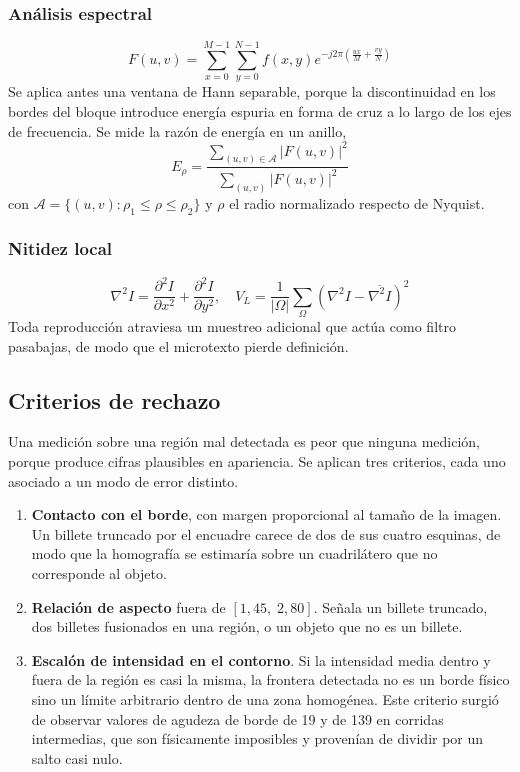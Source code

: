 \documentclass[conference]{IEEEtran}
\begin{document}
\subsubsection{Análisis espectral}
\begin{equation}
F(u,v) = \sum_{x=0}^{M-1}\sum_{y=0}^{N-1}
f(x,y)e^{-j2\pi\left(\frac{ux}{M}+\frac{vy}{N}\right)}
\end{equation}
Se aplica antes una ventana de Hann separable, porque la discontinuidad
en los bordes del bloque introduce energía espuria en forma de cruz a
lo largo de los ejes de frecuencia. Se mide la razón de energía en un
anillo,
\begin{equation}
E_\rho = \frac{\sum_{(u,v)\in\mathcal{A}}|F(u,v)|^2}{\sum_{(u,v)}|F(u,v)|^2}
\end{equation}
con $\mathcal{A}=\{(u,v): \rho_1\le\rho\le\rho_2\}$ y $\rho$ el radio
normalizado respecto de Nyquist.

\subsubsection{Nitidez local}
\begin{equation}
\nabla^2 I = \frac{\partial^2I}{\partial x^2}+\frac{\partial^2I}{\partial y^2},
\quad
V_L = \frac{1}{|\Omega|}\sum_{\Omega}\left(\nabla^2I-\overline{\nabla^2I}\right)^2
\end{equation}
Toda reproducción atraviesa un muestreo adicional que actúa como filtro
pasabajas, de modo que el microtexto pierde definición.

\subsection{Criterios de rechazo}
\label{sec:rechazo}

Una medición sobre una región mal detectada es peor que ninguna
medición, porque produce cifras plausibles en apariencia. Se aplican
tres criterios, cada uno asociado a un modo de error distinto.

\begin{enumerate}
\item \textbf{Contacto con el borde}, con margen proporcional al tamaño
      de la imagen. Un billete truncado por el encuadre carece de dos
      de sus cuatro esquinas, de modo que la homografía se estimaría
      sobre un cuadrilátero que no corresponde al objeto.
\item \textbf{Relación de aspecto} fuera de $[1{,}45,\;2{,}80]$. Señala
      un billete truncado, dos billetes fusionados en una región, o un
      objeto que no es un billete.
\item \textbf{Escalón de intensidad en el contorno}. Si la intensidad
      media dentro y fuera de la región es casi la misma, la frontera
      detectada no es un borde físico sino un límite arbitrario dentro
      de una zona homogénea. Este criterio surgió de observar valores
      de agudeza de borde de 19 y de 139 en corridas intermedias, que
      son físicamente imposibles y provenían de dividir por un salto
      casi nulo.
\end{enumerate}
\end{document}
